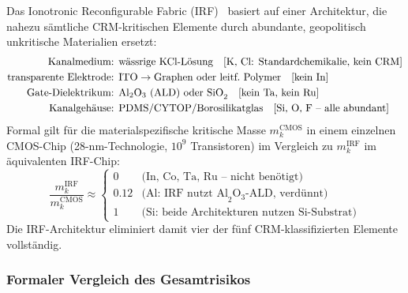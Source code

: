 ﻿\documentclass[12pt, a4paper]{report}
\theoremstyle{definition}
\theoremstyle{remark}
\begin{document}
Das Ionotronic Reconfigurable Fabric (IRF)~\cite{ionotronik2026} basiert
auf einer Architektur, die nahezu sämtliche CRM-kritischen Elemente durch
abundante, geopolitisch unkritische Materialien ersetzt:
\begin{align}
  \text{Kanalmedium: }
    & \text{wässrige KCl-Lösung}\quad
      [\text{K, Cl: Standardchemikalie, kein CRM}] \notag \\
  \text{transparente Elektrode: }
    & \text{ITO}\to\text{Graphen oder leitf.\ Polymer}\quad
      [\text{kein In}] \notag \\
  \text{Gate-Dielektrikum: }
    & \text{Al}_2\text{O}_3\text{ (ALD) oder SiO}_2\quad
      [\text{kein Ta, kein Ru}] \notag \\
  \text{Kanalgehäuse: }
    & \text{PDMS/CYTOP/Borosilikatglas}\quad
      [\text{Si, O, F -- alle abundant}] \notag
\end{align}
Formal gilt für die materialspezifische kritische Masse
$m_k^\text{CMOS}$ in einem einzelnen CMOS-Chip (28-nm-Technologie,
$10^9$ Transistoren) im Vergleich zu $m_k^\text{IRF}$ im äquivalenten
IRF-Chip:
\begin{equation}
  \frac{m_k^\text{IRF}}{m_k^\text{CMOS}}
  \approx
  \begin{cases}
    0      & \text{(In, Co, Ta, Ru -- nicht benötigt)} \\
    0.12   & \text{(Al: IRF nutzt Al}_2\text{O}_3\text{-ALD, verdünnt)} \\
    1      & \text{(Si: beide Architekturen nutzen Si-Substrat)}
  \end{cases}
  \label{eq:crm_ratio}
\end{equation}
Die IRF-Architektur eliminiert damit vier der fünf CRM-klassifizierten
Elemente vollständig.

\subsubsection{Formaler Vergleich des Gesamtrisikos}
\end{document}
